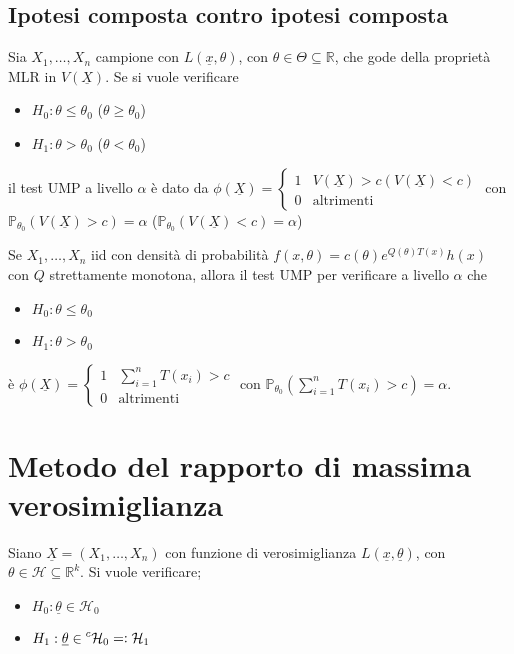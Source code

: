 \documentclass[hidelinks, 10pt]{report}
\begin{document}
\subsection{Ipotesi composta contro ipotesi composta}
\begin{thm}
Sia $ X_{1}, \dotsc, X_{n} $ campione con $ L(\underline{x}, \theta) $, con $ \theta \in \Theta \subseteq \mathbb{R} $, che gode della propriet\`a MLR in $ V(\underline{X}) $. Se si vuole verificare
\begin{itemize}
\item $ H_{0} : \theta \le \theta_{0} $ ($ \theta \ge \theta_{0} $)
\item $ H_{1} : \theta > \theta_{0} $ ($ \theta < \theta_{0} $)
\end{itemize}

il test UMP a livello $ \alpha $ \`e dato da $ \phi(\underline{X}) = \begin{cases} 1 & V(\underline{X}) > c (V(\underline{X}) < c) \\ 0 & \text{altrimenti} \end{cases} $ con $ \mathbb{P}_{\theta_{0}} (V(\underline{X}) > c) = \alpha $ ($ \mathbb{P}_{\theta_{0}} (V(\underline{X}) < c) = \alpha $)
\end{thm}

\begin{cor}
Se $ X_{1}, \dotsc, X_{n} $ iid con densit\`a di probabilit\`a $ f(x, \theta) = c(\theta) e^{Q(\theta) T(x)} h(x) $ con $ Q $ strettamente monotona, allora il test UMP per verificare a livello $ \alpha $ che
\begin{itemize}
\item $ H_{0} : \theta \le \theta_{0} $
\item $ H_{1} : \theta > \theta_{0} $
\end{itemize}

\`e $ \phi(\underline{X}) = \begin{cases} 1 & \sum\limits_{i = 1}^{n} T(x_{i}) > c \\ 0 & \text{altrimenti} \end{cases} $ con $ \mathbb{P}_{\theta_{0}} (\sum\limits_{i = 1}^{n} T(x_{i}) > c) = \alpha $.
\end{cor}

\section{Metodo del rapporto di massima verosimiglianza}
Siano $ \underline{X} = (X_{1}, \dotsc, X_{n}) $ con funzione di verosimiglianza $ L(\underline{x}, \underline{\theta}) $, con $ \theta \in \mathcal{H} \subseteq \mathbb{R}^{k} $. Si vuole verificare;
\begin{itemize}
\item $ H_{0}: \underline{\theta} \in \mathcal{H}_{0} $
\item $ H_{1}: \underline{\theta} \in \prescript{c}{}{\mathcal{H}_{0}} =\vcentcolon \mathcal{H}_{1} $
\end{itemize}
\end{document}
